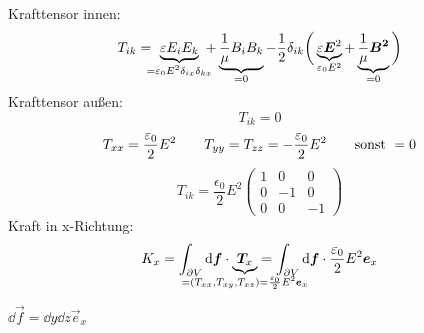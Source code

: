 \begin{enumerate}[i)]
\begin{minipage}{.4\linewidth}
		\flushright
	\end{minipage}%
	\\
	Krafttensor innen:
	\begin{equation*}
	T_{ik} = \ \ub{\epsilon E_i E_k}_{\mathclap{= \epsilon_0 E^2 \delta_{ix} \delta_{kx}}} \ + \ub{\frac{1}{\mu} B_i B_k}_{=0} - \frac{1}{2} \delta_{ik} \bigg(\ub{\epsilon \vec{E}^2}_{\epsilon_0 E^2} + \ub{\frac{1}{\mu} \vec{B^2}}_{= 0}\bigg)
	\end{equation*}
	Krafttensor außen:
	\begin{equation*}
	T_{ik} = 0
	\end{equation*}
	\vspace{5pt}
	\begin{equation*}
	T_{xx} = \frac{\varepsilon_0}{2} E^2 \qquad T_{yy} = T_{zz} = - \frac{\varepsilon_0}{2} E^2 \qquad \textrm{sonst } = 0
	\end{equation*}
	\begin{equation*}
	T_{ik} = \frac{\epsilon_0}{2} E^2 \begin{pmatrix}
	1 & 0 & 0\\
	0 & -1 & 0\\
	0 & 0 & -1
	\end{pmatrix}
	\end{equation*}
	Kraft in x-Richtung:
	\begin{equation*}
	K_x = \int_{\partial V} \dd\vec{f} \cdot \ub{\vec{T}_x}_{\mathclap{= (T_{xx},T_{xy},T_{xz}) = \frac{\epsilon_0}{2} E^2 \vec{e}_x}} = \int_{\partial V} \dd \vec{f} \cdot \frac{\epsilon_0}{2} E^2 \vec{e}_x
	\end{equation*}
	\begin{minipage}{.6\linewidth}
		$ \dd \vec{f} = \dd y \dd z \vec{e}_x $
		\begin{equation*}

\end{equation*}
\end{minipage}
\end{enumerate}
